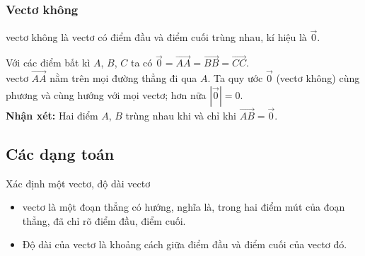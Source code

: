     \subsubsection{Vectơ không}
    \begin{dn}{}
    	vectơ không là vectơ có điểm đầu và điểm cuối trùng nhau, kí hiệu là $\vec{0}$.
    \end{dn}
    Với các điểm bất kì $A$, $B$, $C$ ta có $\vec{0} = \vec{AA} =\vec{BB} = \vec{CC}$.\\
    vectơ $\vec{AA}$ nằm trên mọi đường thẳng đi qua $A$. Ta quy ước $\vec{0}$ (vectơ không) cùng phương và cùng hướng với mọi vectơ; hơn nữa $\left| \vec{0} \right| = 0$.\\
    \textbf{Nhận xét:} Hai điểm $A$, $B$ trùng nhau khi và chỉ khi $\vec{AB} = \vec{0}$.


\subsection{Các dạng toán}

\begin{dang}{Xác định một vectơ, độ dài vectơ}
	\begin{itemize}
		\item vectơ là một đoạn thẳng có hướng, nghĩa là, trong hai điểm mút của đoạn thẳng, đã chỉ rõ điểm đầu, điểm cuối.
		\item Độ dài của vectơ là khoảng cách giữa điểm đầu và điểm cuối của vectơ đó.
	\end{itemize}
\end{dang}	

